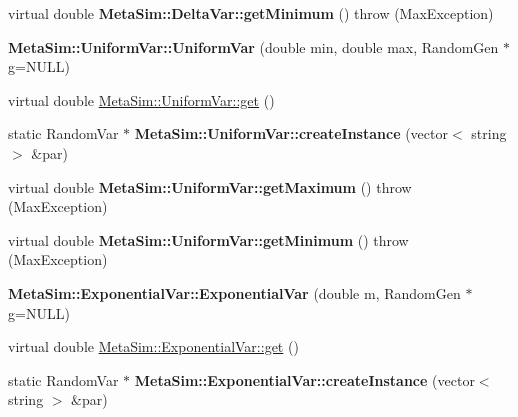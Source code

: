 \begin{DoxyCompactItemize}
\item 
virtual double {\bfseries Meta\+Sim\+::\+Delta\+Var\+::get\+Minimum} ()  throw (\+Max\+Exception)\hypertarget{group__metasim__random_gae2d7ef4295390d902ef16114c3d79466}{}\label{group__metasim__random_gae2d7ef4295390d902ef16114c3d79466}

\item 
{\bfseries Meta\+Sim\+::\+Uniform\+Var\+::\+Uniform\+Var} (double min, double max, Random\+Gen $\ast$g=N\+U\+LL)\hypertarget{group__metasim__random_ga890dfc75e4eeb6a2851aea1871d0ea54}{}\label{group__metasim__random_ga890dfc75e4eeb6a2851aea1871d0ea54}

\item 
virtual double \hyperlink{group__metasim__random_gacc8e14498f0e48cbece5f65f52c65020}{Meta\+Sim\+::\+Uniform\+Var\+::get} ()
\item 
static Random\+Var $\ast$ {\bfseries Meta\+Sim\+::\+Uniform\+Var\+::create\+Instance} (vector$<$ string $>$ \&par)\hypertarget{group__metasim__random_ga06102a8d217a3ee2368b5e1b840fba55}{}\label{group__metasim__random_ga06102a8d217a3ee2368b5e1b840fba55}

\item 
virtual double {\bfseries Meta\+Sim\+::\+Uniform\+Var\+::get\+Maximum} ()  throw (\+Max\+Exception)\hypertarget{group__metasim__random_gaaf6dab9e856b86292734a8f87257a630}{}\label{group__metasim__random_gaaf6dab9e856b86292734a8f87257a630}

\item 
virtual double {\bfseries Meta\+Sim\+::\+Uniform\+Var\+::get\+Minimum} ()  throw (\+Max\+Exception)\hypertarget{group__metasim__random_ga9678c16207bb916f6c3ff3ed03f81670}{}\label{group__metasim__random_ga9678c16207bb916f6c3ff3ed03f81670}

\item 
{\bfseries Meta\+Sim\+::\+Exponential\+Var\+::\+Exponential\+Var} (double m, Random\+Gen $\ast$g=N\+U\+LL)\hypertarget{group__metasim__random_ga5f4cf462dd8d4893260986f47fa8c6a3}{}\label{group__metasim__random_ga5f4cf462dd8d4893260986f47fa8c6a3}

\item 
virtual double \hyperlink{group__metasim__random_ga84b931546a4cffde57bb958ac9f442d6}{Meta\+Sim\+::\+Exponential\+Var\+::get} ()
\item 
static Random\+Var $\ast$ {\bfseries Meta\+Sim\+::\+Exponential\+Var\+::create\+Instance} (vector$<$ string $>$ \&par)\hypertarget{group__metasim__random_gaf259c86b8f0d6b76ae34603273a54dc6}{}\label{group__metasim__random_gaf259c86b8f0d6b76ae34603273a54dc6}


\end{DoxyCompactItemize}
